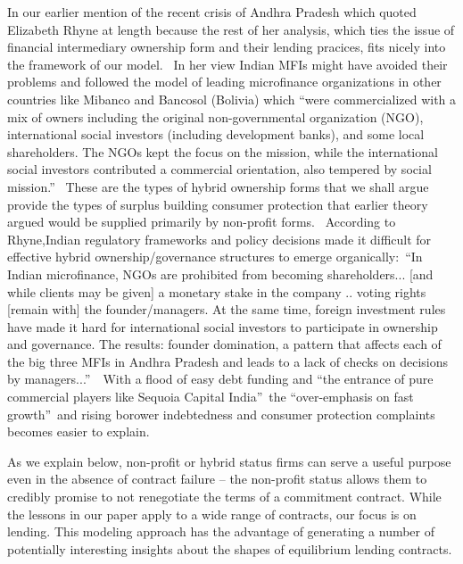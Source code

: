 \documentclass[11pt]{article}%
\begin{document}
In our earlier mention of the recent crisis of Andhra Pradesh which quoted
Elizabeth Rhyne at length because the rest of her analysis, which ties the
issue of financial intermediary ownership form and their lending pracices,
fits nicely into the framework of our model. \ In her view Indian MFIs might
have avoided their problems and followed the model of leading microfinance
organizations in other countries like Mibanco and Bancosol (Bolivia) which
\textquotedblleft were commercialized with a mix of owners including the
original non-governmental organization (NGO), international social investors
(including development banks), and some local shareholders. The NGOs kept the
focus on the mission, while the international social investors contributed a
commercial orientation, also tempered by social mission.\textquotedblright%
\ These are the types of hybrid ownership forms that we shall argue provide
the types of surplus building consumer protection that earlier theory argued
would be supplied primarily by non-profit forms. \ According to Rhyne,Indian
regulatory frameworks and policy decisions made it difficult for effective
hybrid ownership/governance structures to emerge
organically:\ \textquotedblleft In Indian microfinance, NGOs are prohibited
from becoming shareholders... [and while clients may be given] a monetary
stake in the company .. voting rights [remain with] the founder/managers. At
the same time, foreign investment rules have made it hard for international
social investors to participate in ownership and governance. The results:
founder domination, a pattern that affects each of the big three MFIs in
Andhra Pradesh and leads to a lack of checks on decisions by
managers...\textquotedblright\ \ With a flood of easy debt funding and
\textquotedblleft the entrance of pure commercial players like Sequoia Capital
India\textquotedblright\ the \textquotedblleft over-emphasis on fast
growth\textquotedblright\ and rising borower indebtedness and consumer
protection complaints becomes easier to explain.

As we explain below, non-profit or hybrid status firms can serve a useful
purpose even in the absence of contract failure -- the non-profit status
allows them to credibly promise to not renegotiate the terms of a commitment
contract. While the lessons in our paper apply to a wide range of contracts,
our focus is on lending. This modeling approach has the advantage of
generating a number of potentially interesting insights about the shapes of
equilibrium lending contracts.

\bigskip
\end{document}
